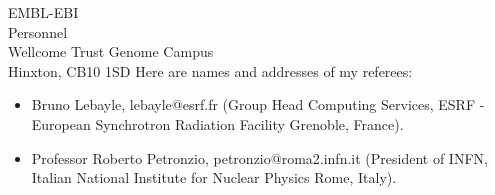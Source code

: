 \begin{letter}{EMBL-EBI \\Personnel \\Wellcome Trust Genome Campus \\Hinxton, CB10 1SD}
Here are names and addresses of my referees:
\begin{itemize}
\item Bruno Lebayle, lebayle@esrf.fr 
  (Group Head Computing Services,
  ESRF - European Synchrotron Radiation Facility
  Grenoble, France).
\item Professor Roberto Petronzio, petronzio@roma2.infn.it
  (President of INFN,  Italian National Institute for Nuclear Physics
  Rome, Italy).
\end{itemize}








\end{letter}
